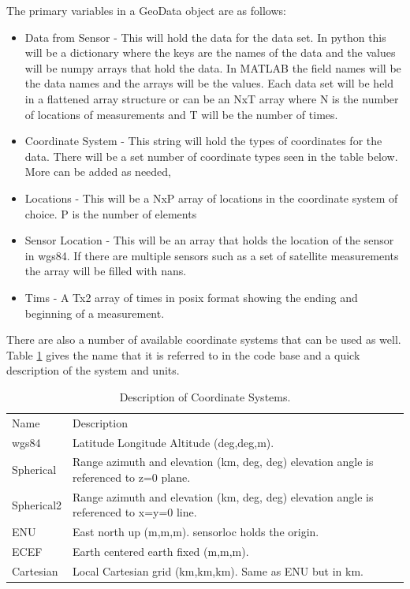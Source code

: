 The primary variables in a GeoData object are as follows: 
\begin{itemize} 
\item Data from Sensor - This will hold the data for the data set. In python this will be a dictionary where the keys are the names of the data and the values will be numpy arrays that hold the data. In MATLAB the field names will be the data names and the arrays will be the values. Each data set will be held in a flattened array structure or can be an NxT array where N is the number of locations of measurements and T will be the number of times.
\item Coordinate System - This string will hold the types of coordinates for the data. There will be a set number of coordinate types seen in the table below. More can be added as needed,
\item Locations - This will be a NxP array of locations in the coordinate system of choice. P is the number of elements
\item Sensor Location - This will be an array that holds the location of the sensor in wgs84. If there are multiple sensors such as a set of satellite measurements the array will be filled with nans.
\item Tims - A Tx2 array of times in posix format showing the ending and beginning of a measurement.
\end{itemize}

There are also a number of available coordinate systems that can be used as well. Table \ref{tab:coord} gives the name that it is referred to in the code base and a quick description of the system and units.

\begin{table}[]
\centering
\caption{Description of Coordinate Systems.}
\label{tab:coord}
\begin{tabular}{p{1in}p{4in}}
Name       & Description                                                                            \\
wgs84      & Latitude Longitude Altitude (deg,deg,m).                                                \\
Spherical  & Range azimuth and elevation (km, deg, deg) elevation angle is referenced to z=0 plane.  \\
Spherical2 & Range azimuth and elevation (km, deg, deg) elevation angle is referenced to x=y=0 line. \\
ENU        & East north up (m,m,m). sensorloc holds the origin.                                      \\
ECEF       & Earth centered earth fixed (m,m,m).                                                     \\
Cartesian  & Local Cartesian grid (km,km,km). Same as ENU but in km.                
\end{tabular}
\end{table}

